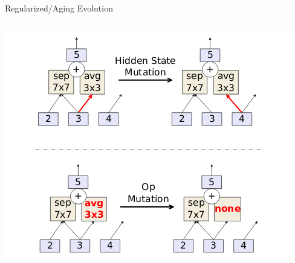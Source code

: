 \begin{frame}[c]{Regularized/Aging Evolution }
\begin{columns}[T]
\includegraphics[width=1.1\textwidth]{images_lec7/aging_evolution_mutations.png}

\end{columns}

\end{frame}
